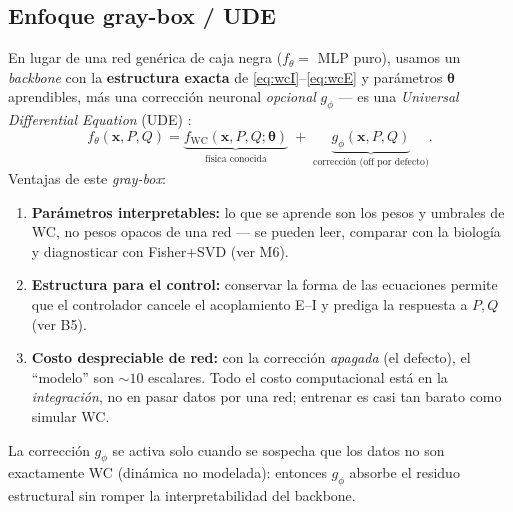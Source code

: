 \documentclass[11pt,a4paper]{article}
\newcommand{\x}{\mathbf{x}}
\newcommand{\thetavec}{\bm{\theta}}
\begin{document}
\subsection{Enfoque gray-box / UDE}
\label{sec:graybox}
En lugar de una red genérica de caja negra ($f_\theta=$ MLP puro), usamos un \emph{backbone} con la \textbf{estructura exacta} de \eqref{eq:wcI}--\eqref{eq:wcE} y parámetros $\thetavec$ aprendibles, más una corrección neuronal \emph{opcional} $g_\phi$ --- es una \emph{Universal Differential Equation} (UDE) \cite{rackauckas2020}:
\begin{equation}
  f_\theta(\x,P,Q)=\underbrace{f_{\mathrm{WC}}(\x,P,Q;\thetavec)}_{\text{física conocida}}
  \;+\;\underbrace{g_\phi(\x,P,Q)}_{\text{corrección (off por defecto)}}.
\end{equation}
Ventajas de este \emph{gray-box}:
\begin{enumerate}[nosep,label=(\roman*)]
  \item \textbf{Parámetros interpretables:} lo que se aprende son los pesos y umbrales de WC, no pesos opacos de una red --- se pueden leer, comparar con la biología y diagnosticar con Fisher+SVD (ver M6).
  \item \textbf{Estructura para el control:} conservar la forma de las ecuaciones permite que el controlador cancele el acoplamiento E--I y prediga la respuesta a $P,Q$ (ver B5).
  \item \textbf{Costo despreciable de red:} con la corrección \emph{apagada} (el defecto), el ``modelo'' son $\sim 10$ escalares. Todo el costo computacional está en la \emph{integración}, no en pasar datos por una red; entrenar es casi tan barato como simular WC.
\end{enumerate}
La corrección $g_\phi$ se activa solo cuando se sospecha que los datos no son exactamente WC (dinámica no modelada): entonces $g_\phi$ absorbe el residuo estructural sin romper la interpretabilidad del backbone.
\end{document}
